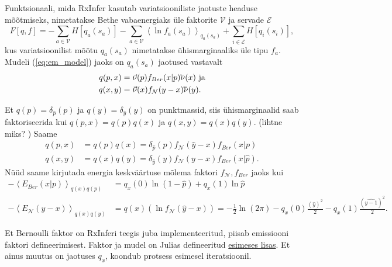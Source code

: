 Funktsionaali, mida RxInfer kasutab variatsiooniliste jaotuste headuse mõõtmiseks, nimetatakse Bethe vabaenergiaks üle faktorite $\mathcal{V}$ ja servade $\mathcal{E}$
\begin{equation}
    \label{eq:bethe}
    F[q,f] = - \sum_{a \in \mathcal{V}} {H[q_a(s_a)]} - \sum_{a \in \mathcal{V}}{\left< \ln f_a(s_a) \right>_{q_{a}(s_a)}} + \sum_{i \in \mathcal{E}}{H[q_i(s_i)]},
\end{equation}
kus variatsioonilist mõõtu $q_a(s_a)$ nimetatakse ühismarginaaliks üle tipu $f_a$. Mudeli (\ref{eq:em_model}) jaoks on $q_a(s_a)$ jaotused vastavalt
\begin{align*}
    q(p, x) &= \vec{\nu}(p) f_{Ber}(x | p) \cev{\nu}(x) \text{ ja}\\
    q(x, y) &= \vec{\nu}(x)f_{\mathcal{N}}(y - x)\cev{\nu}(y).
\end{align*}

Et $q(p) = \delta_{\hat{p}}(p)$ ja $q(y) = \delta_{\hat{y}}(y)$ on punktmassid, siis ühismarginaalid saab faktoriseerida kui $q(p, x) = q(p)q(x)$ ja $q(x, y) = q(x)q(y)$. (lihtne miks? \bla) Saame
\begin{align*}
    q(p,x) &= q(p)q(x) = \delta_{\hat{p}}(p) f_{\mathcal{N}}(\hat{y} -x) f_{Ber}(x | p)\\
    q(x,y) &= q(x)q(y) = \delta_{\hat{y}}(y) f_{\mathcal{N}}(y -x) f_{Ber}(x | \hat{p}).
\end{align*}
Nüüd saame kirjutada energia keskväärtuse mõlema faktori $f_{\mathcal{N}}, f_{Ber}$ jaoks kui
\begin{align*}
    -\left< E_{Ber}(x | p) \right>_{q(x)q(p)} &= q_x(0)\ln (1-\hat{p}) + q_x(1) \ln \hat{p}\\
    -\left< E_{\mathcal{N}}(y - x) \right>_{q(x)q(y)} &= q(x) \left( \ln f_{\mathcal{N}}(\hat{y}-x) \right) =  -\frac{1}{2}\ln(2\pi) - q_x(0) \frac{(\hat{y})^2}{2} - q_x(1)\frac{(\hat{y-1})^2}{2}.
\end{align*}

Et Bernoulli faktor on RxInferi teegis juba implementeeritud, piisab emissiooni faktori defineerimisest. Faktor ja mudel on Julias defineeritud
\hyperref[section:lisa1]{esimeses lisas}. Et ainus muutus on jaotuses $q_x$, koondub protsess esimesel iteratsioonil.


